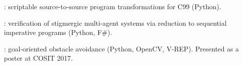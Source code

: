 
\begin{tightemize}
    \item
    \href{https://github.com/lou1306/absentee}{}: scriptable source-to-source program transformations for C99
    (Python).

    \item
    \href{https://github.com/labs-lang/sliver}{}\@:
    verification of stigmergic multi-agent systems
    via reduction to sequential imperative programs
    (Python, F\#).
    
    \item
    \href{https://github.com/lou1306/localpathplanner}{}: goal-oriented obstacle avoidance (Python, OpenCV, V-REP).
    Presented as a poster at COSIT 2017. 
\end{tightemize}